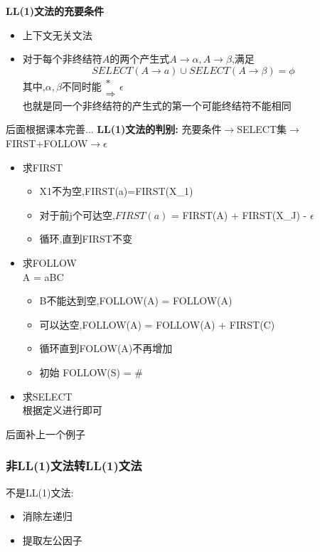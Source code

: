 \documentclass[UTF8,a4paper]{ctexart}
\newcommand{\spaceline}{\vspace{\baselineskip}}
\begin{document}
  \spaceline
  \textbf{LL(1)文法的充要条件}
  \begin{itemize}
    \item 上下文无关文法
    \item 对于每个非终结符$A$的两个产生式$A \to \alpha ,A \to \beta$,满足
    \[SELECT(A\to a) \cup SELECT(A \to \beta) = \phi\]
    其中,$\alpha , \beta$不同时能$\renewcommand{\arraystretch}{0.5} \begin{array}{c} * \\ \Rightarrow \end{array} \epsilon$\\
    {\color{blue}也就是同一个非终结符的产生式的第一个可能终结符不能相同}
  \end{itemize}

{\color{red}后面根据课本完善...}
\spaceline
\textbf{LL(1)文法的判别:}
充要条件$\to$SELECT集$\to$FIRST+FOLLOW$\to$$\epsilon$

\begin{itemize}
  \item 求FIRST\\
  \begin{itemize}
    \item X1不为空,FIRST(a)=FIRST(X_1)
    \item 对于前j个可达空,$FIRST(a)$ = FIRST(A) + FIRST(X_J) - {$\epsilon$}
    \item 循环,直到FIRST不变
  \end{itemize}
  \item 求FOLLOW\\
  A = aBC
  \begin{itemize}
    \item B不能达到空,FOLLOW(A) = FOLLOW(A)
    \item 可以达空,FOLLOW(A) = FOLLOW(A) + FIRST(C)
    \item 循环直到FOLOW(A)不再增加
    \item 初始 FOLLOW(S) = {$\#$}
  \end{itemize}
  \item 求SELECT\\
  根据定义进行即可
\end{itemize}

{\color{red}后面补上一个例子}

\subsubsection{非LL(1)文法转LL(1)文法}
不是LL(1)文法:
\begin{itemize}
  \item 消除左递归
  \item 提取左公因子
\end{itemize}
\end{document}
